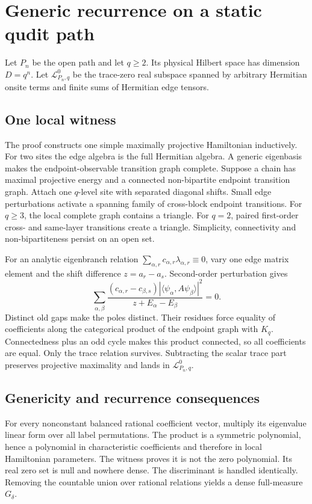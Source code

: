 \section{Generic recurrence on a static qudit path}

Let $P_n$ be the open path and let $q\ge2$.  Its physical Hilbert space
has dimension $D=q^n$.  Let $\mathcal L_{P_n,q}^0$ be the trace-zero real
subspace spanned by arbitrary Hermitian onsite terms and finite sums of
Hermitian edge tensors.

\subsection{One local witness}

The proof constructs one simple maximally projective Hamiltonian inductively.
For two sites the edge algebra is the full Hermitian algebra.  A generic
eigenbasis makes the endpoint-observable transition graph complete.  Suppose
a chain has maximal projective energy and a connected non-bipartite endpoint
transition graph.  Attach one $q$-level site with separated diagonal
shifts.  Small edge perturbations activate a spanning family of cross-block
endpoint transitions.  For $q\ge3$, the local complete graph contains a
triangle.  For $q=2$, paired first-order cross- and same-layer transitions
create a triangle.  Simplicity, connectivity and non-bipartiteness persist
on an open set.

For an analytic eigenbranch relation
$\sum_{\alpha,r}c_{\alpha,r}\lambda_{\alpha,r}\equiv0$, vary one edge
matrix element and the shift difference $z=a_r-a_s$.  Second-order
perturbation gives
\[
 \sum_{\alpha,\beta}
 \frac{(c_{\alpha,r}-c_{\beta,s})
 |\langle\psi_\alpha,A\psi_\beta\rangle|^2}
 {z+E_\alpha-E_\beta}=0.
\]
Distinct old gaps make the poles distinct.  Their residues force equality
of coefficients along the categorical product of the endpoint graph with
$K_q$.  Connectedness plus an odd cycle makes this product connected, so
all coefficients are equal.  Only the trace relation survives.  Subtracting
the scalar trace part preserves projective maximality and lands in
$\mathcal L_{P_n,q}^0$.

\subsection{Genericity and recurrence consequences}

For every nonconstant balanced rational coefficient vector, multiply its
eigenvalue linear form over all label permutations.  The product is a
symmetric polynomial, hence a polynomial in characteristic coefficients and
therefore in local Hamiltonian parameters.  The witness proves it is not the
zero polynomial.  Its real zero set is null and nowhere dense.  The
discriminant is handled identically.  Removing the countable union over
rational relations yields a dense full-measure $G_\delta$.

